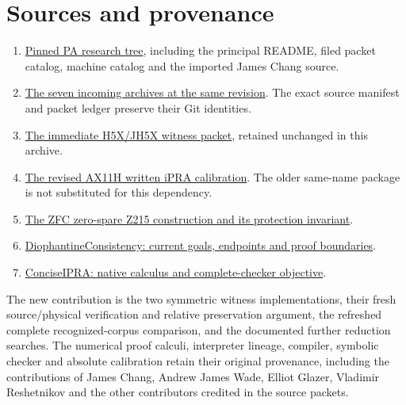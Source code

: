 \documentclass[10pt,letterpaper]{article}
\begin{document}
\section{Sources and provenance}
\begin{enumerate}
\item \href{https://github.com/VladimirReshetnikov/ProveIt/tree/3c3bf00e3132d31d328a7bcfe79761ef238eced3/Computability/BusyBeaver/Research/PA}{Pinned PA research tree}, including the principal README, filed packet catalog, machine catalog and the imported James Chang source.
\item \href{https://github.com/VladimirReshetnikov/ProveIt/tree/3c3bf00e3132d31d328a7bcfe79761ef238eced3/docs/incoming}{The seven incoming archives at the same revision}.  The exact source manifest and packet ledger preserve their Git identities.
\item \href{https://github.com/VladimirReshetnikov/ProveIt/blob/3c3bf00e3132d31d328a7bcfe79761ef238eced3/docs/incoming/pa194_witness_research_2026-11-15.zip}{The immediate H5X/JH5X witness packet}, retained unchanged in this archive.
\item \href{https://github.com/VladimirReshetnikov/ProveIt/tree/3c3bf00e3132d31d328a7bcfe79761ef238eced3/Computability/BusyBeaver/Research/PA/docs/pa194_ax11h_research_2026-11-14_2}{The revised AX11H written iPRA calibration}.  The older same-name package is not substituted for this dependency.
\item \href{https://github.com/VladimirReshetnikov/ProveIt/tree/3c3bf00e3132d31d328a7bcfe79761ef238eced3/Computability/BusyBeaver/Research/ZFC/candidate-k215/alternatives/zero-spare}{The ZFC zero-spare Z215 construction and its protection invariant}.
\item \href{https://github.com/VladimirReshetnikov/ProveIt/blob/3c3bf00e3132d31d328a7bcfe79761ef238eced3/Computability/DiophantineConsistency/README.md}{DiophantineConsistency: current goals, endpoints and proof boundaries}.
\item \href{https://github.com/VladimirReshetnikov/ProveIt/blob/3c3bf00e3132d31d328a7bcfe79761ef238eced3/Logic/PrimitiveRecursiveArithmetic/ConciseIPRA/README.md}{ConciseIPRA: native calculus and complete-checker objective}.
\end{enumerate}
The new contribution is the two symmetric witness implementations,
their fresh source/physical verification and relative preservation
argument, the refreshed complete recognized-corpus comparison, and the
documented further reduction searches.  The numerical proof calculi,
interpreter lineage, compiler, symbolic checker and absolute calibration
retain their original provenance, including the contributions of
James Chang, Andrew James Wade, Elliot Glazer, Vladimir Reshetnikov and
the other contributors credited in the source packets.
\end{document}
